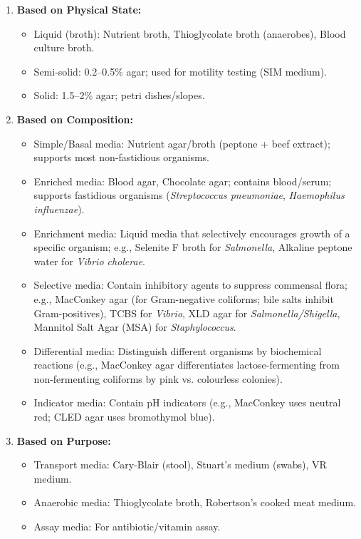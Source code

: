 \documentclass[11pt,a4paper]{article}
\begin{document}
\begin{ansbox}
\begin{enumerate}[leftmargin=*]
    \item \textbf{Based on Physical State:}
    \begin{itemize}
        \item Liquid (broth): Nutrient broth, Thioglycolate broth (anaerobes), Blood culture broth.
        \item Semi-solid: 0.2--0.5\% agar; used for motility testing (SIM medium).
        \item Solid: 1.5--2\% agar; petri dishes/slopes.
    \end{itemize}
    \item \textbf{Based on Composition:}
    \begin{itemize}
        \item Simple/Basal media: Nutrient agar/broth (peptone + beef extract); supports most non-fastidious organisms.
        \item Enriched media: Blood agar, Chocolate agar; contains blood/serum; supports fastidious organisms (\textit{Streptococcus pneumoniae}, \textit{Haemophilus influenzae}).
        \item Enrichment media: Liquid media that selectively encourages growth of a specific organism; e.g., Selenite F broth for \textit{Salmonella}, Alkaline peptone water for \textit{Vibrio cholerae}.
        \item Selective media: Contain inhibitory agents to suppress commensal flora; e.g., MacConkey agar (for Gram-negative coliforms; bile salts inhibit Gram-positives), TCBS for \textit{Vibrio}, XLD agar for \textit{Salmonella/Shigella}, Mannitol Salt Agar (MSA) for \textit{Staphylococcus}.
        \item Differential media: Distinguish different organisms by biochemical reactions (e.g., MacConkey agar differentiates lactose-fermenting from non-fermenting coliforms by pink vs. colourless colonies).
        \item Indicator media: Contain pH indicators (e.g., MacConkey uses neutral red; CLED agar uses bromothymol blue).
    \end{itemize}
    \item \textbf{Based on Purpose:}
    \begin{itemize}
        \item Transport media: Cary-Blair (stool), Stuart's medium (swabs), VR medium.
        \item Anaerobic media: Thioglycolate broth, Robertson's cooked meat medium.
        \item Assay media: For antibiotic/vitamin assay.
    \end{itemize}
\end{enumerate}
\end{ansbox}
\end{document}
